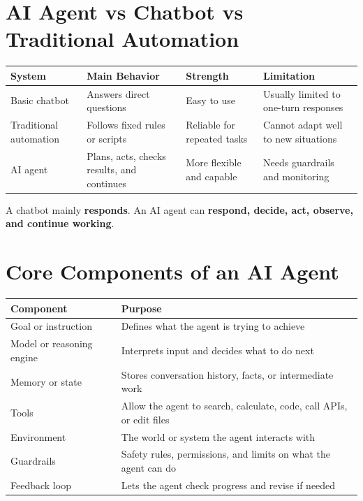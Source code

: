 \documentclass[11pt,a4paper]{article}
\begin{document}
\section{AI Agent vs Chatbot vs Traditional Automation}

\begin{center}
\begin{tabular}{@{}p{3.2cm}p{3.6cm}p{3.6cm}p{3.2cm}@{}}
\toprule
\textbf{System} & \textbf{Main Behavior} & \textbf{Strength} & \textbf{Limitation} \\
\midrule
Basic chatbot & Answers direct questions & Easy to use & Usually limited to one-turn responses \\
Traditional automation & Follows fixed rules or scripts & Reliable for repeated tasks & Cannot adapt well to new situations \\
AI agent & Plans, acts, checks results, and continues & More flexible and capable & Needs guardrails and monitoring \\
\bottomrule
\end{tabular}
\end{center}

\begin{conceptbox}
A chatbot mainly \textbf{responds}. An AI agent can \textbf{respond, decide, act, observe, and continue working}.
\end{conceptbox}

\section{Core Components of an AI Agent}

\begin{longtable}{@{}p{3.6cm}p{9.9cm}@{}}
\toprule
\rowcolor{primary!15}
\textbf{Component} & \textbf{Purpose} \\
\midrule
\endhead
Goal or instruction & Defines what the agent is trying to achieve \\
\addlinespace
Model or reasoning engine & Interprets input and decides what to do next \\
\addlinespace
Memory or state & Stores conversation history, facts, or intermediate work \\
\addlinespace
Tools & Allow the agent to search, calculate, code, call APIs, or edit files \\
\addlinespace
Environment & The world or system the agent interacts with \\
\addlinespace
Guardrails & Safety rules, permissions, and limits on what the agent can do \\
\addlinespace
Feedback loop & Lets the agent check progress and revise if needed \\
\bottomrule
\end{longtable}
\end{document}
